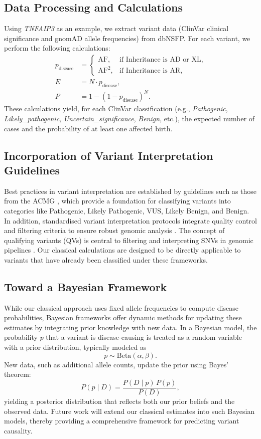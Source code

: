 \subsection{Data Processing and Calculations}
Using \textit{TNFAIP3} as an example, we extract variant data (ClinVar clinical significance and gnomAD allele frequencies) from dbNSFP. For each variant, we perform the following calculations:
\begin{align*}
p_{\text{disease}} &= 
\begin{cases}
\text{AF}, & \text{if Inheritance is AD or XL},\\[1mm]
\text{AF}^2, & \text{if Inheritance is AR},
\end{cases}\\[1mm]
E &= N \cdot p_{\text{disease}},\\[1mm]
P &= 1 - (1 - p_{\text{disease}})^N.
\end{align*}
These calculations yield, for each ClinVar classification (e.g., \textit{Pathogenic}, \textit{Likely\_pathogenic}, \textit{Uncertain\_significance}, \textit{Benign}, etc.), the expected number of cases and the probability of at least one affected birth.

\subsection{Incorporation of Variant Interpretation Guidelines}
Best practices in variant interpretation are established by guidelines such as those from the ACMG \citep{richards2015standards}, which provide a foundation for classifying variants into categories like Pathogenic, Likely Pathogenic, VUS, Likely Benign, and Benign. In addition, standardised variant interpretation protocols integrate quality control and filtering criteria to ensure robust genomic analysis \citep{pedersen2021effective,anderson2010data}. The concept of qualifying variants (QVs) is central to filtering and interpreting SNVs in genomic pipelines \citep{cirulli2015exome,tavtigian2020fitting}. Our classical calculations are designed to be directly applicable to variants that have already been classified under these frameworks.

\subsection{Toward a Bayesian Framework}
While our classical approach uses fixed allele frequencies to compute disease probabilities, Bayesian frameworks offer dynamic methods for updating these estimates by integrating prior knowledge with new data. In a Bayesian model, the probability $p$ that a variant is disease-causing is treated as a random variable with a prior distribution, typically modeled as
\[
p \sim \text{Beta}(\alpha, \beta).
\]
New data, such as additional allele counts, update the prior using Bayes' theorem:
\[
P(p \mid D) = \frac{P(D \mid p) \, P(p)}{P(D)},
\]
yielding a posterior distribution that reflects both our prior beliefs and the observed data. Future work will extend our classical estimates into such Bayesian models, thereby providing a comprehensive framework for predicting variant causality.


